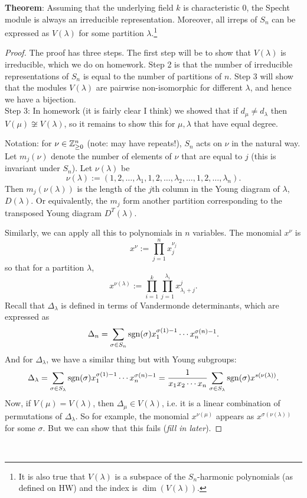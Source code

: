 \documentclass{amsart}
\begin{document}
\textbf{Theorem}: Assuming that the underlying field $k$ is characteristic 0, the Specht module is always an irreducible representation. Moreover, all irreps of $S_n$ can be expressed as $V(\lambda)$ for some partition $\lambda$.\footnote{It is also true that $V(\lambda)$ is a subspace of the $S_n$-harmonic polynomials (as defined on HW) and the index is $\dim(V(\lambda))$.}

\begin{proof}
	The proof has three steps. The first step will be to show that $V(\lambda)$ is irreducible, which we do on homework. Step 2 is that the number of irreducible representations of $S_n$ is equal to the number of partitions of $n$. Step 3 will show that the modules $V(\lambda)$ are pairwise non-isomorphic for different $\lambda$, and hence we have a bijection.\\
	
	Step 3: In homework (it is fairly clear I think) we showed that if $d_{\mu}\neq d_{\lambda}$ then $V(\mu)\not\cong V(\lambda)$, so it remains to show this for $\mu,\lambda$ that have equal degree.
	
	Notation: for $\nu \in \mathbb{Z}_{\geq 0}^n$ (note: may have repeats!), $S_n$ acts on $\nu$ in the natural way. Let $m_j(\nu)$ denote the number of elements of $\nu$ that are equal to $j$ (this is invariant under $S_n$). Let $\nu(\lambda)$ be 
	$$
	\nu(\lambda) := (1,2,\dots,\lambda_1,1,2,\dots,\lambda_2,\dots ,1,2,\dots,\lambda_n).
	$$
	Then $m_j(\nu(\lambda))$ is the length of the $j$th column in the Young diagram of $\lambda$, $D(\lambda)$. Or equivalently, the $m_j$ form another partition corresponding to the transposed Young diagram $D^T(\lambda)$.
	
	Similarly, we can apply all this to polynomials in $n$ variables. The monomial $x^{\nu}$ is
	$$
	x^{\nu} := \prod_{j=1}^nx_j^{\nu_j}
	$$
	so that for a partition $\lambda$,
	$$
	x^{\nu(\lambda)} := \prod_{i=1}^k \prod_{j=1}^{\lambda_i} x_{\lambda_i + j}^{j}.
	$$
	Recall that $\Delta_{\lambda}$ is defined in terms of Vandermonde determinants, which are expressed as
	$$
	\Delta_n = \sum_{\sigma \in S_n} \operatorname{sgn}(\sigma) x_1^{\sigma(1)-1}\cdots x_n^{\sigma(n)-1}.
	$$
	And for $\Delta_{\lambda}$, we have a similar thing but with Young subgroups:
	$$
	\Delta_{\lambda} = \sum_{\sigma \in S_{\lambda}} \operatorname{sgn}(\sigma) x_1^{\sigma(1)-1} \cdots x_n^{\sigma(n)-1} =  \frac{1}{x_1x_2\cdots x_n} \sum_{\sigma \in S_{\lambda}} \operatorname{sgn}(\sigma) x^{s(\nu(\lambda))}. 
	$$
	Now, if $V(\mu)=V(\lambda)$, then $\Delta_{\mu}\in V(\lambda)$, i.e. it is a linear combination of permutations of $\Delta_{\lambda}$. So for example, the monomial $x^{\nu(\mu)}$ appears as $x^{\sigma(\nu(\lambda))}$ for some $\sigma$. But we can show that this fails (\textit{fill in later}).
\end{proof}\\
\end{document}
